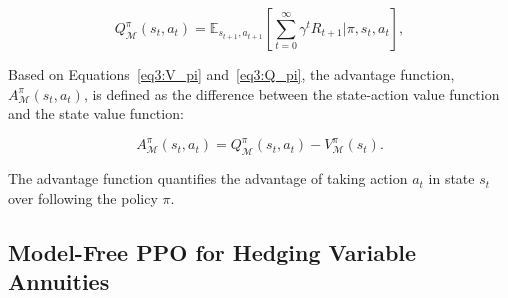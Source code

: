 \begin{equation} \label{eq3:Q_pi}
    Q^{\pi}_{\mathcal{M}}(s_t, a_t) = \mathbb{E}_{s_{t+1}, a_{t+1}} \left[ \sum_{t=0}^{\infty} \gamma^t R_{t+1} |\pi, s_t, a_t \right],
\end{equation}

Based on Equations~\ref{eq3:V_pi} and~\ref{eq3:Q_pi}, the advantage function, $A^{\pi}_{\mathcal{M}}(s_t, a_t)$, is defined as the difference between the state-action value function and the state value function:

\begin{equation} \label{eq3:A_pi}
    A^{\pi}_{\mathcal{M}}(s_t, a_t) = Q^{\pi}_{\mathcal{M}}(s_t, a_t) - V^{\pi}_{\mathcal{M}}(s_t).
\end{equation}

The advantage function quantifies the advantage of taking action $a_t$ in state $s_t$ over following the policy $\pi$.


\subsection{Model-Free PPO for Hedging Variable Annuities}

